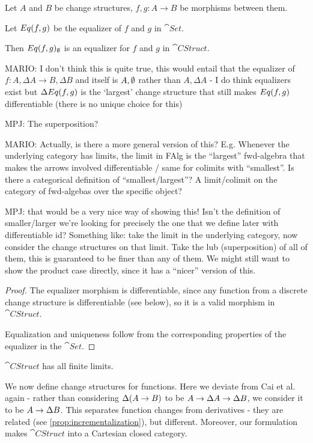 \begin{prop}[Equalizers]
  Let $A$ and $B$ be change structures, $f, g: A \rightarrow B$ be morphisms
  between them.

  Let $Eq(f, g)$ be the equalizer of $f$ and $g$ in $\cat{Set}$.

  Then $Eq(f, g)_\emptyset$ is an equalizer for $f$ and $g$
  in $\cat{CStruct}$.

  MARIO: I don't think this is quite true, this would entail that the equalizer of
  $f : A, \Delta A \rightarrow B,\Delta B$ and itself is $A, \emptyset$ rather than
  $A, \Delta A$ - I do think equalizers exist but $\Delta Eq(f, g)$ is the
  `largest' change structure that still makes $Eq(f, g)$ differentiable (there
  is no unique choice for this)

  MPJ: The superposition?

  MARIO: Actually, is there a more general version of this? E.g. Whenever the underlying
  category has limits, the limit in FAlg is the ``largest'' fwd-algebra that makes the arrows
  involved differentiable / same for colimits with ``smallest''. Is there a categorical definition
  of ``smallest/largest''? A limit/colimit on the category of fwd-algebas over the specific object?

  MPJ: that would be a very nice way of showing this! Isn't the definition of
  smaller/larger we're looking for precisely the one that we define later with
  differentiable id? Something like: take the limit in the underlying category,
  now consider the change structures on that limit. Take the lub (superposition)
  of all of them, this is guaranteed to be finer than any of them. We might
  still want to show the product case directly, since it has a ``nicer'' version
  of this.
\end{prop}
\begin{proof}
  The equalizer morphism is differentiable, since any function from a discrete change
  structure is differentiable (see below), so it is a valid morphism in $\cat{CStruct}$.

  Equalization and uniqueness follow from the corresponding properties of the
  equalizer in the $\cat{Set}$.
\end{proof}

\begin{thm}
  $\cat{CStruct}$ has all finite limits.
\end{thm}

We now define change structures for functions. Here we deviate from Cai et al.
again - rather than considering $\Delta (A \rightarrow B)$ to be $A
\rightarrow \Delta A \rightarrow \Delta B$, we consider it to be $A
\rightarrow \Delta B$. This separates function changes from derivatives -
they are related (see \ref{prop:incrementalization}), but different. Moreover,
our formulation makes $\cat{CStruct}$ into a Cartesian closed category.

